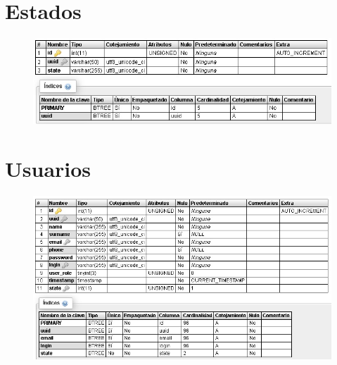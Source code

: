 \pagebreak



\section{Estados}
\begin{figure}[h]
\centering
\includegraphics[width=1\textwidth]{Img/Disenyo/BD_STATE_TYPES.jpg}
\end{figure}

\section{Usuarios}
\begin{figure}[h]
\centering
\includegraphics[width=1\textwidth]{Img/Disenyo/BD_USERS.jpg}
\end{figure}

